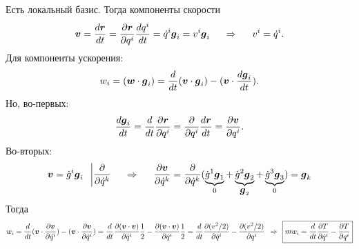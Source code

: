 Есть локальный базис. Тогда компоненты скорости
\begin{equation}
    \mbox{\boldmath $v$} = \frac{d \mbox{\boldmath $r$}}{dt} = \frac{\partial \mbox{\boldmath $r$}}{\partial q^i} \frac{d q^i}{dt} = \dot{q}^i \mbox{\boldmath $g$}_i = v^i \mbox{\boldmath $g$}_i 
    \hspace{0.5cm} \Rightarrow \hspace{0.5cm} v^i = \dot{q}^i.
\end{equation}
Для компоненты ускорения:
\begin{equation*}
    w_i = (\mbox{\boldmath $w$} \cdot \mbox{\boldmath $g$}_i) = \frac{d}{dt} (\mbox{\boldmath $v$} \cdot \mbox{\boldmath $g$}_i) - (\mbox{\boldmath $v$} \cdot \frac{d \mbox{\boldmath $g$}_i}{dt}).
\end{equation*}
Но, во-первых:
\begin{equation*}
\label{I}
    \frac{d \mbox{\boldmath $g$}_i}{dt} = \frac{d}{dt} \frac{\partial \mbox{\boldmath $r$}}{\partial q^i} =
    \frac{\partial}{\partial q^i} \frac{d \mbox{\boldmath $r$}}{dt} = \frac{\partial \mbox{\boldmath $v$}}{\partial q^i} .
\end{equation*}
Во-вторых:
\begin{equation}
\label{II}
    \mbox{\boldmath $v$} = \dot{g}^i \mbox{\boldmath $g$}_i \hspace{0.25cm}  \bigg|\frac{\partial}{\partial \dot{q}^k} 
    \hspace{0.5cm} \Rightarrow \hspace{0.5cm} 
    \frac{\partial \mbox{\boldmath $v$}}{\partial \dot{q}^k} = \frac{\partial}{\partial \dot{q}^k}
    (\underbrace{\dot{g}^1 \mbox{\boldmath $g$}_1}_{0} + \underbrace{\dot{g}^2 \mbox{\boldmath $g$}_2}_{\mbox{\boldmath $g$}_2} + \underbrace{\dot{g}^3 \mbox{\boldmath $g$}_3}_{0})  = \mbox{\boldmath $g$}_k
\end{equation}
Тогда
\begin{equation}
    w_i = \frac{d}{dt} (\mbox{\boldmath $v$} \cdot \frac{\partial \mbox{\boldmath $v$}}{\partial \dot{q}^i} ) - 
    (\mbox{\boldmath $v$} \cdot \frac{\partial \mbox{\boldmath $v$}}{\partial \dot{q}^i}) =
    \frac{d}{dt} \frac{\partial (\mbox{\boldmath $v$} \cdot \mbox{\boldmath $v$})}{\partial \dot{q}^i} \frac{1}{2} - \frac{\partial (\mbox{\boldmath $v$} \cdot \mbox{\boldmath $v$})}{\partial \dot{q}^i} \frac{1}{2} =
    {
    \frac{d}{dt} \frac{\partial (v^2/2)}{\partial \dot{q}^i} - \frac{\partial (v^2/2)}{\partial q^i}
    }  \hspace{0.15cm} \Rightarrow \hspace{0.15cm} 
    \boxed{
    mw_i = \frac{d}{dt} \frac{\partial T}{\partial \dot{q}^i} - \frac{\partial T}{\partial q^i}}
\end{equation}